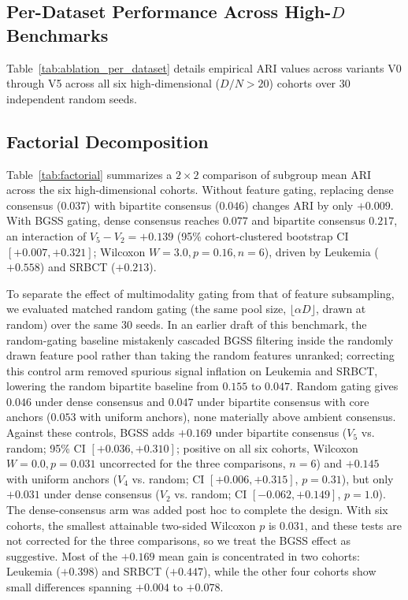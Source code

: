 \documentclass[pdflatex,sn-mathphys-num]{sn-jnl}
\theoremstyle{thmstyleone}
\theoremstyle{thmstyletwo}
\theoremstyle{thmstylethree}
\begin{document}
\subsection{Per-Dataset Performance Across High-$D$ Benchmarks}\label{sec:ablation_per_dataset}
Table~\ref{tab:ablation_per_dataset} details empirical ARI values across variants V0 through V5 across all six high-dimensional ($D/N > 20$) cohorts over 30 independent random seeds.



\subsection{Factorial Decomposition}\label{sec:exp2_knockout}



Table~\ref{tab:factorial} summarizes a $2 \times 2$ comparison of subgroup mean ARI across the six high-dimensional cohorts. Without feature gating, replacing dense consensus ($0.037$) with bipartite consensus ($0.046$) changes ARI by only $+0.009$. With BGSS gating, dense consensus reaches $0.077$ and bipartite consensus $0.217$, an interaction of $V_5 - V_2 = +0.139$ (95\% cohort-clustered bootstrap CI $[+0.007, +0.321]$; Wilcoxon $W = 3.0, p = 0.16, n = 6$), driven by Leukemia ($+0.558$) and SRBCT ($+0.213$).

To separate the effect of multimodality gating from that of feature subsampling, we evaluated matched random gating (the same pool size, $\lfloor \alpha D \rfloor$, drawn at random) over the same 30 seeds. In an earlier draft of this benchmark, the random-gating baseline mistakenly cascaded BGSS filtering inside the randomly drawn feature pool rather than taking the random features unranked; correcting this control arm removed spurious signal inflation on Leukemia and SRBCT, lowering the random bipartite baseline from $0.155$ to $0.047$. Random gating gives $0.046$ under dense consensus and $0.047$ under bipartite consensus with core anchors ($0.053$ with uniform anchors), none materially above ambient consensus. Against these controls, BGSS adds $+0.169$ under bipartite consensus ($V_5$ vs. random; 95\% CI $[+0.036, +0.310]$; positive on all six cohorts, Wilcoxon $W = 0.0, p = 0.031$ uncorrected for the three comparisons, $n = 6$) and $+0.145$ with uniform anchors ($V_4$ vs. random; CI $[+0.006, +0.315]$, $p = 0.31$), but only $+0.031$ under dense consensus ($V_2$ vs. random; CI $[-0.062, +0.149]$, $p = 1.0$). The dense-consensus arm was added post hoc to complete the design. With six cohorts, the smallest attainable two-sided Wilcoxon $p$ is $0.031$, and these tests are not corrected for the three comparisons, so we treat the BGSS effect as suggestive. Most of the $+0.169$ mean gain is concentrated in two cohorts: Leukemia ($+0.398$) and SRBCT ($+0.447$), while the other four cohorts show small differences spanning $+0.004$ to $+0.078$.
\end{document}
